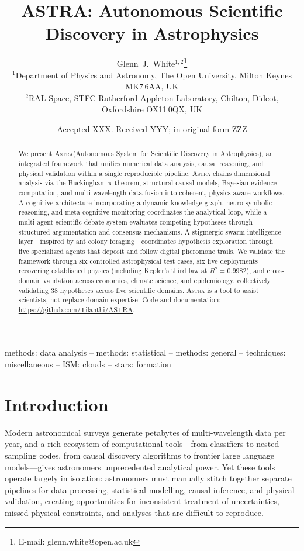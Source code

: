 \documentclass[usenatbib]{rasti}
\title[ASTRA: Autonomous Scientific Discovery in Astrophysics]{ASTRA: Autonomous Scientific Discovery in Astrophysics}
\author[White]{
Glenn~J.~White$^{1,2}$\thanks{E-mail: glenn.white@open.ac.uk}\\
$^{1}$Department of Physics and Astronomy, The Open University, Milton Keynes MK7\,6AA, UK\\
$^{2}$RAL Space, STFC Rutherford Appleton Laboratory, Chilton, Didcot, Oxfordshire OX11\,0QX, UK
}
\date{Accepted XXX. Received YYY; in original form ZZZ}
\newcommand{\astra}{\textsc{Astra}\xspace}
\begin{document}
\maketitle

\begin{abstract}
We present \astra (Autonomous System for Scientific Discovery in Astrophysics), an integrated framework that unifies numerical data analysis, causal reasoning, and physical validation within a single reproducible pipeline.
\astra chains dimensional analysis via the Buckingham $\pi$ theorem, structural causal models, Bayesian evidence computation, and multi-wavelength data fusion into coherent, physics-aware workflows.
A cognitive architecture incorporating a dynamic knowledge graph, neuro-symbolic reasoning, and meta-cognitive monitoring coordinates the analytical loop, while a multi-agent scientific debate system evaluates competing hypotheses through structured argumentation and consensus mechanisms.
A stigmergic swarm intelligence layer---inspired by ant colony foraging---coordinates hypothesis exploration through five specialized agents that deposit and follow digital pheromone trails.
We validate the framework through six controlled astrophysical test cases, six live deployments recovering established physics (including Kepler's third law at $R^{2}=0.9982$), and cross-domain validation across economics, climate science, and epidemiology, collectively validating 38 hypotheses across five scientific domains.
\astra is a tool to assist scientists, not replace domain expertise.
Code and documentation: \url{https://github.com/Tilanthi/ASTRA}.
\end{abstract}

\begin{keywords}
methods: data analysis -- methods: statistical -- methods: general -- techniques: miscellaneous -- ISM: clouds -- stars: formation
\end{keywords}

\section{Introduction}
\label{sec:introduction}

Modern astronomical surveys generate petabytes of multi-wavelength data per year, and a rich ecosystem of computational tools---from classifiers to nested-sampling codes, from causal discovery algorithms \citep{Spirtes2000} to frontier large language models---gives astronomers unprecedented analytical power.
Yet these tools operate largely in isolation: astronomers must manually stitch together separate pipelines for data processing, statistical modelling, causal inference, and physical validation, creating opportunities for inconsistent treatment of uncertainties, missed physical constraints, and analyses that are difficult to reproduce.
\end{document}
